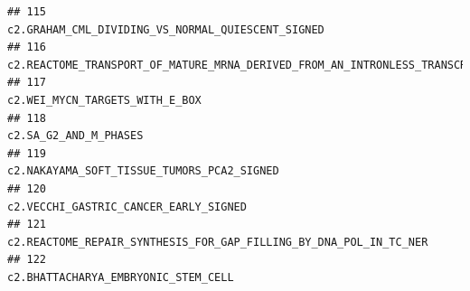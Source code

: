 \documentclass{article}\usepackage[]{graphicx}\usepackage[]{color}
\makeatletter
\newenvironment{kframe}{%
 \def\at@end@of@kframe{}%
 \ifinner\ifhmode%
  \def\at@end@of@kframe{\end{minipage}}%
  \begin{minipage}{\columnwidth}%
 \fi\fi%
 \def\FrameCommand##1{\hskip\@totalleftmargin \hskip-\fboxsep
 \colorbox{shadecolor}{##1}\hskip-\fboxsep
     \hskip-\linewidth \hskip-\@totalleftmargin \hskip\columnwidth}%
 \MakeFramed {\advance\hsize-\width
   \@totalleftmargin\z@ \linewidth\hsize
   \@setminipage}}%
 {\par\unskip\endMakeFramed%
 \at@end@of@kframe}
\newenvironment{knitrout}{}{} %
\makeatother
\begin{document}
\begin{knitrout}
\begin{kframe}
\begin{verbatim}
## 115                                                                                                                                                                                                                                                                                                     c2.GRAHAM_CML_DIVIDING_VS_NORMAL_QUIESCENT_SIGNED
## 116                                                                                                                                                                                                                                                                            c2.REACTOME_TRANSPORT_OF_MATURE_MRNA_DERIVED_FROM_AN_INTRONLESS_TRANSCRIPT
## 117                                                                                                                                                                                                                                                                                                                        c2.WEI_MYCN_TARGETS_WITH_E_BOX
## 118                                                                                                                                                                                                                                                                                                                                 c2.SA_G2_AND_M_PHASES
## 119                                                                                                                                                                                                                                                                                                            c2.NAKAYAMA_SOFT_TISSUE_TUMORS_PCA2_SIGNED
## 120                                                                                                                                                                                                                                                                                                                 c2.VECCHI_GASTRIC_CANCER_EARLY_SIGNED
## 121                                                                                                                                                                                                                                                                                     c2.REACTOME_REPAIR_SYNTHESIS_FOR_GAP_FILLING_BY_DNA_POL_IN_TC_NER
## 122                                                                                                                                                                                                                                                                                                                   c2.BHATTACHARYA_EMBRYONIC_STEM_CELL

\end{verbatim}
\end{kframe}
\end{knitrout}
\end{document}
